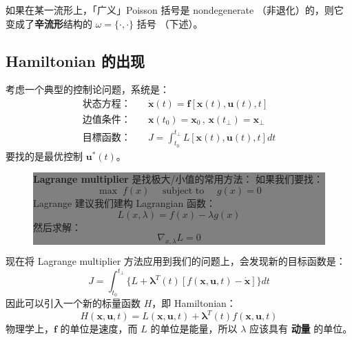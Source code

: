 \documentclass[orivec]{llncs}
\newcommand{\emp}[1]{\textbf{\textcolor{Cerulean}{#1}}}
\newcommand{\vect}[1]{\boldsymbol{#1}}
\begin{document}
如果在某一流形上，「广义」Poisson 括号是 nondegenerate （非退化）的，则它变成了\emp{辛流形}结构的 $\omega = \{ \cdot, \cdot \}$ 括号 （下述）。

\subsection{Hamiltonian 的出现}

考虑一个典型的控制论问题，系统是：
\begin{eqnarray}
\mbox{状态方程：} \quad & \dot{\vect{x}}(t) = \vect{f}[\vect{x}(t), \vect{u}(t), t] \\
\mbox{边值条件：} \quad & \vect{x}(t_0) = \vect{x}_0 \,,\, \vect{x}(t_\bot) = \vect{x}_\bot \\
\mbox{目標函数：} \quad & J = \int_{t_0}^{t_\bot} L[\vect{x}(t), \vect{u}(t), t] dt
\end{eqnarray}
要找的是最优控制 $\vect{u}^*(t)$。

\begin{figure}[H]
\begin{center}
\colorbox{grey}{\parbox{0.95\textwidth}{\setlength{\parskip}{2.5ex}

\emp{Lagrange multiplier} 是找极大/小值的常用方法： 如果我们要找：
\begin{equation}
\max \; f(x) \quad \mbox{ subject to } \quad g(x) = 0
\end{equation}
Lagrange 建议我们建构 Lagrangian 函数：
\begin{equation}
L(x, \lambda) = f(x) - \lambda g(x)
\end{equation}
然后求解：
\begin{equation}
\nabla_{x,\lambda} L = 0
\end{equation}
}}
\end{center}
\end{figure}

现在将 Lagrange multiplier 方法应用到我们的问题上，会发现新的目标函数是：
\begin{equation}
J = \int_{t_0}^{t_\bot} \{ L + \vect{\lambda}^T(t) \left[ f(\vect{x}, \vect{u}, t) - \dot{\vect{x}} \right] \} dt
\end{equation}
因此可以引入一个新的标量函数 $H$，即 Hamiltonian：
\begin{equation}
H(\vect{x}, \vect{u}, t) = L(\vect{x}, \vect{u}, t) + \vect{\lambda}^T(t) f(\vect{x}, \vect{u}, t)
\end{equation}
物理学上，$\vect{f}$ 的单位是速度，而 $L$ 的单位是能量，所以 $\lambda$ 应该具有 \emp{动量} 的单位。
\end{document}
